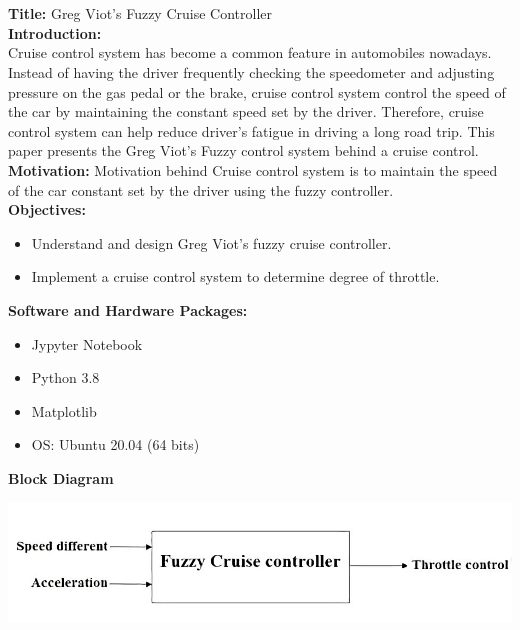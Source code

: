\documentclass[a4paper, 12pt, fleqn]{article}
\begin{document}
\newpage

\section*{}
\textbf{Title:} Greg Viot's Fuzzy Cruise Controller\\

\noindent
\textbf{Introduction:} \\
Cruise control system has become a common feature in automobiles nowadays.
Instead of having the driver frequently checking the speedometer and adjusting pressure
on the gas pedal or the brake, cruise control system control the speed of the car by
maintaining the constant speed set by the driver. Therefore, cruise control system can
help reduce driver’s fatigue in driving a long road trip. This paper presents the Greg Viot's Fuzzy control system behind a cruise control.\\

\textbf{Motivation:}
Motivation behind Cruise control system is to maintain the speed of the car constant
set by the driver using the fuzzy controller. \\

\noindent
\textbf{Objectives:}
\begin{itemize}
	\item Understand and design Greg Viot's fuzzy cruise controller.
	\item Implement a cruise control system to determine degree of throttle. \\
\end{itemize}

\noindent
\textbf{Software and Hardware Packages:}
\begin{itemize}
	\item Jypyter Notebook
	\item Python 3.8
	\item Matplotlib
	\item OS: Ubuntu 20.04 (64 bits) \\
\end{itemize}

\noindent
\textbf{Block Diagram}
\begin{center}
	\vspace{0.1cm}
	\includegraphics[scale=1.75]{block_diagram}
\end{center}
\end{document}
